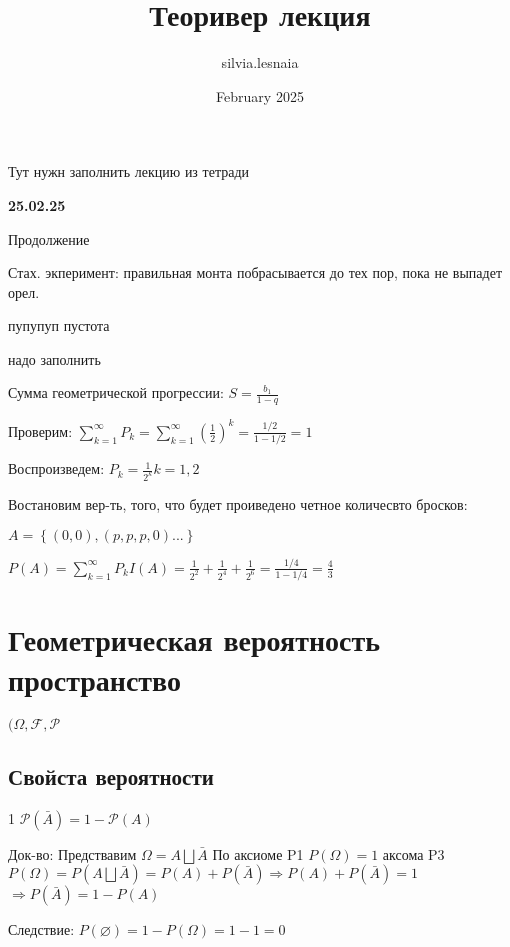 \documentclass{article}
\title{Теоривер лекция}
\author{silvia.lesnaia }
\date{February 2025}
\begin{document}
\maketitle


Тут нужн заполнить лекцию из тетради


\textbf{25.02.25}


Продолжение



Стах. экперимент: правильная монта побрасывается до тех пор, пока не выпадет орел.


пупупуп пустота

надо заполнить



Сумма геометрической прогрессии: $S= \frac{b_1}{1-q}$

Проверим:
$\sum_{k = 1}^{\infty} P_k = \sum_{k = 1}^{\infty} (\frac{1}{2})^k  
= \frac{1/2}{1-1/2} = 1$ 


Воспроизведем: $P_k = \frac{1}{2^k} k = 1,2$

Востановим вер-ть, того, что будет проиведено четное количесвто бросков:

$A = \left\{(0,0),(p,p,p,0)...\right\}  $

$P(A) = \sum_{k = 1}^{\infty} P_k I(A) = \frac{1}{2^2} + \frac{1}{2^4} + \frac{1}{2^6}
= \frac{1/4}{1-1/4} = \frac{4}{3}$



\section{Геометрическая вероятность пространство}

$(\Omega, \mathcal{F}, \mathcal{P} $



\subsection{Свойста вероятности}


1 $\mathcal{P} (\bar{A}) = 1 - \mathcal{P} (A)$


Док-во: Предствавим $\Omega = A\bigsqcup \bar{A}$
По аксиоме P1 $P(\Omega) = 1$
аксома P3 $P(\Omega) = P(A\bigsqcup \bar{A}) = P(A) + P(\bar{A}) \Rightarrow P(A) + P(\bar{A}) = 1$
$\Rightarrow P(\bar{A}) = 1 - P(A)$

Следствие: $P(\varnothing ) = 1 - P(\Omega) = 1-1=0$

\vspace{5mm}
\end{document}

